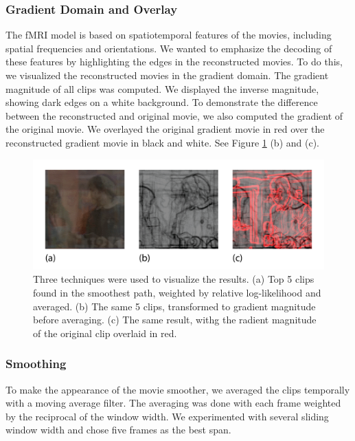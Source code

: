 \subsubsection{Gradient Domain and Overlay}
The fMRI model is based on spatiotemporal features of the movies, including spatial frequencies and orientations. We wanted to emphasize the decoding of these features by highlighting the edges in the reconstructed movies. To do this, we visualized the reconstructed movies in the gradient domain. The gradient magnitude of all clips was computed. We displayed the inverse magnitude, showing dark edges on a white background. To demonstrate the difference between the reconstructed and original movie, we also computed the gradient of the original movie. We overlayed the original gradient movie in red over the reconstructed gradient movie in black and white. See Figure \ref{fig:viz} (b) and (c).

\begin{figure}
\centering
    \includegraphics[width=1.0\columnwidth]{figures/vizfig.png}
\caption{Three techniques were used to visualize the results. (a) Top 5 clips found in the smoothest path, weighted by relative log-likelihood and averaged. (b) The same 5 clips, transformed to gradient magnitude before averaging. (c) The same result, withg the radient magnitude of the original clip overlaid in red.}
\label{fig:viz}
\end{figure}

\subsubsection{Smoothing}
To make the appearance of the movie smoother, we averaged the clips temporally with a moving average filter. The averaging was done with each frame weighted by the reciprocal of the window width. We experimented with several sliding window width and chose five frames as the best span.